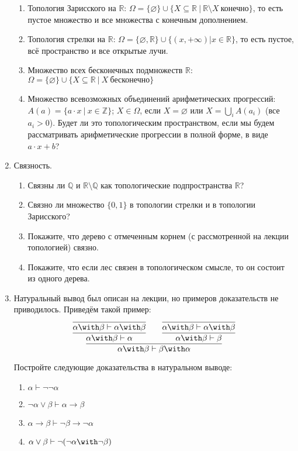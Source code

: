 \documentclass[10pt,a4paper,oneside]{article}
\begin{document}
\begin{enumerate}
\begin{enumerate}
\item Топология Зарисского на $\mathbb{R}$: 
$\Omega = \{\varnothing\} \cup \{ X \subseteq \mathbb{R}\ |\ \mathbb{R} \setminus X\ \text{конечно} \}$,
то есть пустое множество и все множества с конечным дополнением.
\item Топология стрелки на $\mathbb{R}$:
$\Omega = \{\varnothing, \mathbb{R}\} \cup \{ (x,+\infty) | x \in \mathbb{R} \}$, то есть пустое, 
всё пространство и все открытые лучи.
\item Множество всех бесконечных подмножеств $\mathbb{R}$:
$\Omega = \{\varnothing\} \cup \{ X \subseteq \mathbb{R}\ |\ X\ \text{бесконечно} \}$
\item Множество всевозможных объединений арифметических прогрессий:
$A(a) = \{ a\cdot x\ |\ x \in \mathbb{Z}\}$;
$X \in \Omega$, если $X=\varnothing$ или $X = \bigcup_i A(a_i)$ (все $a_i > 0$).
Будет ли это топологическим пространством, если мы будем рассматривать арифметические прогрессии
в полной форме, в виде $a \cdot x + b$?
\end{enumerate}



\item Связность.
\begin{enumerate}
\item Связны ли $\mathbb{Q}$ и $\mathbb{R}\setminus\mathbb{Q}$ как топологические подпространства $\mathbb{R}$?
\item Связно ли множество $\{0,1\}$ в топологии стрелки и в топологии Зарисского?
\item Покажите, что дерево с отмеченным корнем (с рассмотренной на лекции топологией) связно.
\item Покажите, что если лес связен в топологическом смысле, то он состоит из одного дерева.
\end{enumerate}

\item Натуральный вывод был описан на лекции, но примеров доказательств не приводилось. Приведём такой пример: 
$$\infer{\alpha\with\beta\vdash\beta\with\alpha}{
    \infer{\alpha\with\beta\vdash\alpha}{\infer{\alpha\with\beta\vdash\alpha\with\beta}{}}\quad\quad
    \infer{\alpha\with\beta\vdash\beta}{\infer{\alpha\with\beta\vdash\alpha\with\beta}{}}
  }$$

Постройте следующие доказательства в натуральном выводе:

\begin{enumerate}
\item $\alpha\vdash\neg\neg\alpha$
\item $\neg \alpha\vee \beta\vdash \alpha \rightarrow \beta$
\item $\alpha \rightarrow \beta \vdash \neg \beta \rightarrow \neg \alpha$
\item $\alpha \vee \beta \vdash \neg (\neg\alpha\with\neg\beta)$
\end{enumerate}


\end{enumerate}
\end{document}
